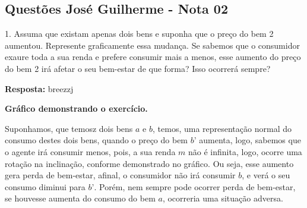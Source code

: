 
\begin{center}
	\section*{Questões José Guilherme - Nota 02}
\end{center}

\begin{flushleft}

1. Assuma que existam apenas dois bens e suponha que o preço do bem 2 aumentou. Represente graficamente essa mudança. Se sabemos que o consumidor exaure toda a sua renda e prefere consumir mais a menos, esse aumento do preço do bem 2 irá afetar o seu bem-estar de que forma? Isso ocorrerá sempre? \singlespacing

\textbf{Resposta:} breezzj


\begin{center}
\textbf{Gráfico demonstrando o exercício.} 
\singlespacing
{}    
\singlespacing

\end{center}
Suponhamos, que temosz dois bens $\textit{a}$ e $\textit{b}$, temos, uma representação normal do consumo destes dois bens, quando o preço do bem $\textit{b'}$ aumenta, logo, sabemos que o agente irá consumir menos, pois, a sua renda $\textit{m}$ não é infinita, logo, ocorre uma rotação na inclinação, conforme demonstrado no gráfico. Ou seja, esse aumento gera perda de bem-estar, afinal, o consumidor não irá consumir $\textit{b}$, e verá o seu consumo diminui para $\textit{b'}$. Porém, nem sempre pode ocorrer perda de bem-estar, se houvesse aumenta do consumo do bem $\textit{a}$, ocorreria uma situação adversa. \singlespacing


\end{flushleft}
